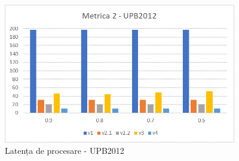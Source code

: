 \documentclass[12pt,a4paper]{report}
\begin{document}
\iftrue
\begin{figure}[th]
\centering
\includegraphics[width=4in]{pics/graphics/grafic12.png}
  \caption[]{Latența de procesare - UPB2012}
  \label{grafic13}
\end{figure}
\fi
\end{document}
